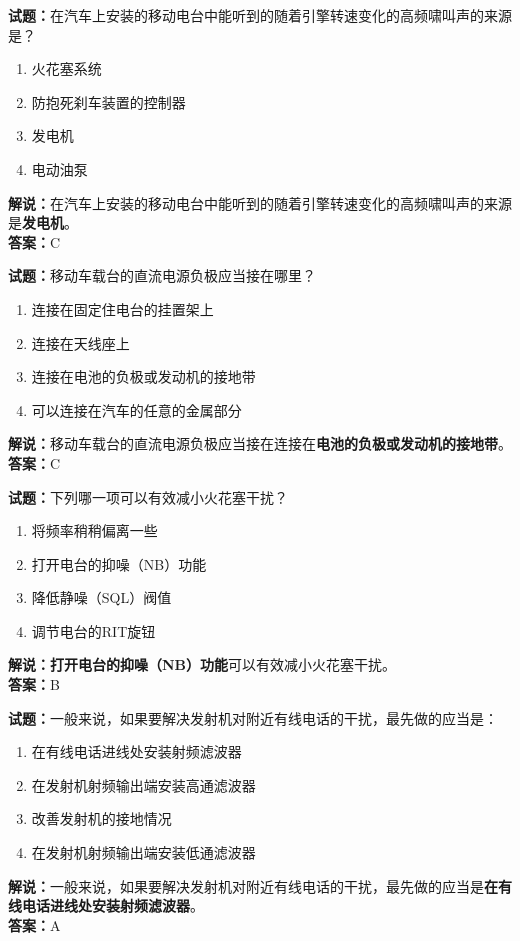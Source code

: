 \documentclass{ctexbook}
\begin{document}
\bigskip


\noindent\textbf{试题：}在汽车上安装的移动电台中能听到的随着引擎转速变化的高频啸叫声的来源是？
\begin{enumerate}[leftmargin=3em]
\item 火花塞系统
\item 防抱死刹车装置的控制器
\item 发电机
\item 电动油泵
\end{enumerate}
\noindent\textbf{解说：}在汽车上安装的移动电台中能听到的随着引擎转速变化的高频啸叫声的来源是\textbf{发电机}。\\\noindent\textbf{答案：}C



\bigskip


\noindent\textbf{试题：}移动车载台的直流电源负极应当接在哪里？
\begin{enumerate}[leftmargin=3em]
\item 连接在固定住电台的挂置架上
\item 连接在天线座上
\item 连接在电池的负极或发动机的接地带
\item 可以连接在汽车的任意的金属部分
\end{enumerate}
\noindent\textbf{解说：}移动车载台的直流电源负极应当接在连接在\textbf{电池的负极或发动机的接地带}。\\\noindent\textbf{答案：}C



\bigskip


\noindent\textbf{试题：}下列哪一项可以有效减小火花塞干扰？
\begin{enumerate}[leftmargin=3em]
\item 将频率稍稍偏离一些
\item 打开电台的抑噪（NB）功能
\item 降低静噪（SQL）阀值
\item 调节电台的RIT旋钮
\end{enumerate}
\noindent\textbf{解说：}\textbf{打开电台的抑噪（NB）功能}可以有效减小火花塞干扰。\\\noindent\textbf{答案：}B



\bigskip


\noindent\textbf{试题：}一般来说，如果要解决发射机对附近有线电话的干扰，最先做的应当是：
\begin{enumerate}[leftmargin=3em]
\item 在有线电话进线处安装射频滤波器
\item 在发射机射频输出端安装高通滤波器
\item 改善发射机的接地情况
\item 在发射机射频输出端安装低通滤波器
\end{enumerate}
\noindent\textbf{解说：}一般来说，如果要解决发射机对附近有线电话的干扰，最先做的应当是\textbf{在有线电话进线处安装射频滤波器}。\\\noindent\textbf{答案：}A
\end{document}
